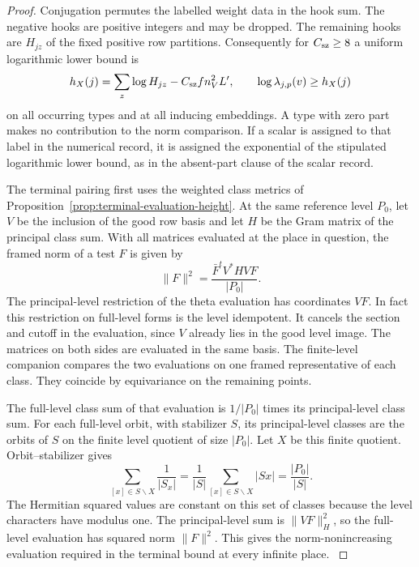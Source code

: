 \begin{proof}
Conjugation permutes the labelled weight data in the
hook sum. The negative hooks are positive integers
and may be dropped. The remaining hooks are
\(H_{jz}\) of the fixed positive row partitions.
Consequently for \(C_{\rm sz}\ge8\) a uniform logarithmic lower bound is
\begin{equation}\label{eq:selected-hX}
 h_X(j)=\sum_z\log H_{jz}-C_{\rm sz} f n_V^2 L',
 \qquad \log\lambda_{j,p}(v)\ge h_X(j)
\end{equation}
on all occurring types and at all inducing embeddings.
A type with zero part makes no contribution to the
norm comparison. If a scalar is assigned to that
label in the numerical record, it is assigned the
exponential of the stipulated logarithmic lower bound, as in the
absent-part clause of the scalar record.
\label{cor:selected-lift-scalar-6}


The terminal pairing first uses the weighted class metrics
of Proposition~\ref{prop:terminal-evaluation-height}. At the
same reference level \(P_0\), let \(V\) be the inclusion of
the good row basis and let \(H\) be the Gram matrix of the
principal class sum. With all matrices evaluated at the place in question, the framed norm of a test \(F\) is given by
\[
 \|F\|^2=\frac{\bar F^{t}V^*HV F}{|P_0|}.
\] The principal-level
restriction of the theta evaluation has coordinates \(VF\).
In fact this restriction on full-level forms is the level
idempotent. It cancels the section and cutoff in the
evaluation, since \(V\) already lies in the good level
image. The matrices on both sides are evaluated in the
same basis. The finite-level companion compares the two evaluations on one framed representative of each class. They coincide by equivariance on the remaining points.

The full-level class sum of that evaluation is \(1/|P_0|\)
times its principal-level class sum. For each full-level
orbit, with stabilizer \(S\), its principal-level classes
are the orbits of \(S\) on the finite level quotient
of size \(|P_0|\). Let \(X\) be this finite quotient. Orbit--stabilizer gives
\[
 \sum_{[x]\in S\backslash X}\frac1{|S_x|}
    =\frac1{|S|}\sum_{[x]\in S\backslash X}|Sx|
    =\frac{|P_0|}{|S|}.
\]
The Hermitian squared values are constant on this set
of classes because the level characters have modulus
one. The principal-level sum is \(\|VF\|_H^2\), so
the full-level evaluation has squared norm \(\|F\|^2\).
This gives the norm-nonincreasing evaluation required
in the terminal bound at every infinite place.
\label{cor:selected-lift-scalar-7}


\end{proof}
